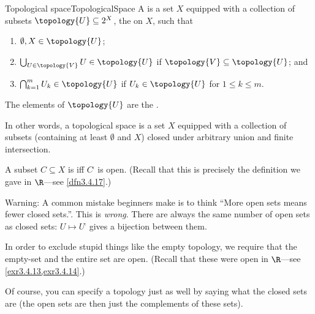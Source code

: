 \begin{dfn}{Topological space}{TopologicalSpace}
A  is a set $X$ equipped with a collection of subsets $\topology{U}\subseteq 2^X$, the  on $X$, such that
\begin{enumerate}
\item \label{enmTopologicalSpace.i}$\emptyset ,X\in \topology{U}$;
\item \label{enmTopologicalSpace.ii}$\bigcup _{U\in \topology{V}}U\in \topology{U}$ if $\topology{V}\subseteq \topology{U}$; and
\item \label{enmTopologicalSpace.iii}$\bigcap _{k=1}^mU_k\in \topology{U}$ if $U_k\in \topology{U}$ for $1\leq k\leq m$.
\end{enumerate}
\begin{rmk}
The elements of $\topology{U}$ are the .
\end{rmk}
\begin{rmk}
In other words, a topological space is a set $X$ equipped with a collection of subsets (containing at least $\emptyset$ and $X$) closed under arbitrary union and finite intersection.
\end{rmk}
\begin{rmk}
A subset $C\subseteq X$ is  iff $C^{\comp}$ is open.  (Recall that this is precisely the definition we gave in $\R$---see \cref{dfn3.4.17}.)
\end{rmk}
\begin{wrn}
Warning:  A common mistake beginners make is to think ``More open sets means fewer closed sets.''.  This is \emph{wrong}.  There are always the same number of open sets as closed sets:  $U\mapsto U^{\comp}$ gives a bijection between them.
\end{wrn}
\begin{rmk}
In order to exclude stupid things like the empty topology, we require that the empty-set and the entire set are open.  (Recall that these were open in $\R$---see \cref{exr3.4.13,exr3.4.14}.)
\end{rmk}
\end{dfn}
Of course, you can specify a topology just as well by saying what the closed sets are (the open sets are then just the complements of these sets).
